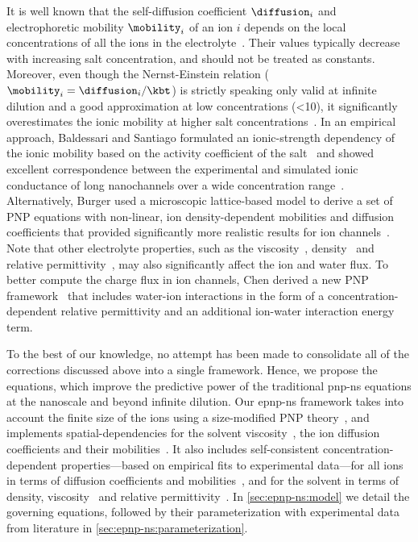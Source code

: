 It is well known that the self-diffusion coefficient $\diffusion_{i}$ and electrophoretic mobility
$\mobility_{i}$ of an ion $i$ depends on the local concentrations of all the ions in the
electrolyte~\cite{ContrerasAburto-2013-1}. Their values typically decrease with increasing salt concentration,
and should not be treated as constants. Moreover, even though the Nernst-Einstein relation
($\mobility_{i}=\diffusion_{i}/\kbt$) is strictly speaking only valid at infinite dilution and a good
approximation at low concentrations (\SI{<10}{\mM}), it significantly overestimates the ionic mobility at
higher salt concentrations~\cite{Mills-1989,Panopoulos-1986,ContrerasAburto-2013-1,ContrerasAburto-2013-2}. In
an empirical approach, Baldessari and Santiago formulated an ionic-strength dependency of the ionic mobility
based on the activity coefficient of the salt~\cite{Baldessari-2008-1} and showed excellent correspondence
between the experimental and simulated ionic conductance of long nanochannels over a wide concentration
range~\cite{Baldessari-2008-2}. Alternatively, Burger \etal{} used a microscopic lattice-based model to derive
a set of PNP equations with non-linear, ion density-dependent mobilities and diffusion coefficients that
provided significantly more realistic results for ion channels~\cite{Burger-2012}. Note that other electrolyte
properties, such as the viscosity~\cite{Hai-Lang-1996}, density~\cite{Hai-Lang-1996} and relative
permittivity~\cite{Gavish-2016}, may also significantly affect the ion and water flux. To better compute the
charge flux in ion channels, Chen derived a new PNP framework~\cite{Chen-2016} that includes water-ion
interactions in the form of a concentration-dependent relative permittivity and an additional ion-water
interaction energy term.

To the best of our knowledge, no attempt has been made to consolidate all of the corrections discussed above
into a single framework. Hence, we propose the  equations, which improve the predictive
power of the traditional \gls{pnp-ns} equations at the nanoscale and beyond infinite dilution. Our
\gls{epnp-ns} framework takes into account the finite size of the ions using a size-modified PNP
theory~\cite{Borukhov-1997,Lu-2011}, and implements spatial-dependencies for the solvent
viscosity~\cite{Pronk-2014,Vo-2016,Hsu-2017}, the ion diffusion coefficients and their
mobilities~\cite{Makarov-1998,Noskov-2004,Pederson-2015}. It also includes self-consistent
concentration-dependent properties---based on empirical fits to experimental data---for all ions in terms of
diffusion coefficients and mobilities~\cite{Baldessari-2008-1,Mills-1989}, and for the solvent in terms of
density, viscosity~\cite{Hai-Lang-1996} and relative permittivity~\cite{Gavish-2016}. In
\cref{sec:epnp-ns:model} we detail the governing equations, followed by their parameterization with
experimental data from literature in \cref{sec:epnp-ns:parameterization}.


